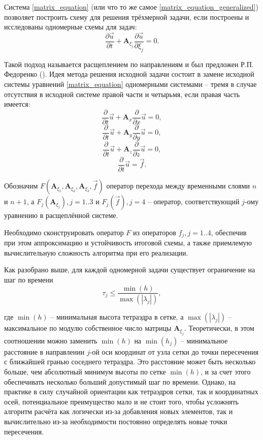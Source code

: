 Система \ref{matrix_equation} (или что то же самое \ref{matrix_equation_generalized}) позволяет построить схему для решения трёхмерной задачи, если построены и исследованы одномерные схемы для задач:
\begin{equation}
\frac{\partial\vec{u}}{\partial{t}} + \mathbf{A}_{\xi_j} \frac{\partial\vec{u}}{\partial{\xi_j}} = 0.
\end{equation}

Такой подход называется расщеплением по направлениям и был предложен Р.П. Федоренко (\cite{fedorenko}). Идея метода решения исходной задачи состоит в замене исходной системы уравнений \ref{matrix_equation} одномерными системами -- тремя в случае отсутствия в исходной системе правой части и четырьмя, если правая часть имеется:
\begin{equation}
\frac{\partial}{\partial t}\vec u+\mathbf{A}_x \frac{\partial}{\partial x}\vec u
= 0,
\label{matrix_equation_x}
\end{equation}
\begin{equation}
\frac{\partial}{\partial t}\vec u+\mathbf{A}_y \frac{\partial}{\partial y}\vec u
= 0,
\label{matrix_equation_y}
\end{equation}
\begin{equation}
\frac{\partial}{\partial t}\vec u+\mathbf{A}_z \frac{\partial}{\partial z}\vec u
= 0,
\label{matrix_equation_z}
\end{equation}
\begin{equation}
\frac{\partial}{\partial t}\vec u = \vec f.
\label{matrix_equation_f}
\end{equation}

Обозначим $F(\mathbf A_{\xi_1}, \mathbf A_{\xi_2}, \mathbf A_{\xi_3}, \vec f)$ оператор перехода между временными слоями $n$ и $n+1$, а $F_j(\mathbf A_{\xi_j}), j=1..3$ и $F_j(\vec f), j=4$ -- оператор, соответствующий $j$-ому уравнению в расщеплённой системе.

Необходимо сконструировать оператор $F$ из операторов $f_j, j=1..4$, обеспечив при этом аппроксимацию и устойчивость итоговой схемы, а также приемлемую вычислительную сложность алгоритма при его реализации.

Как разобрано выше, для каждой одномерной задачи существует ограничение на шаг по времени
\begin{equation}
\tau_j \le \frac{\min(h)}{\max(|\lambda_j|)},
\end{equation}

где $\min(h)$ -- минимальная высота тетраэдра в сетке, а $\max(|\lambda_j|)$ -- максимальное по модулю собственное число матрицы $\mathbf A_{\xi_j}$. Теоретически, в этом соотношении можно заменить $\min(h)$ на $\min(h_j)$ -- минимальное расстояние в направлении $j$-ой оси координат от узла сетки до точки пересечения с ближайшей гранью соседнего тетраэдра. Это расстояние может быть несколько больше, чем абсолютный минимум высоты по сетке $\min(h)$, и за счет этого обеспечивать несколько больший допустимый шаг по времени. Однако, на практике в силу случайной ориентации как тетраэдров сетки, так и координатных осей, потенциальное преимущество мало и не стоит того, чтобы усложнять алгоритм расчёта как логически из-за добавления новых элементов, так и вычислительно из-за необходимости постоянно определять новые точки пересечения.

